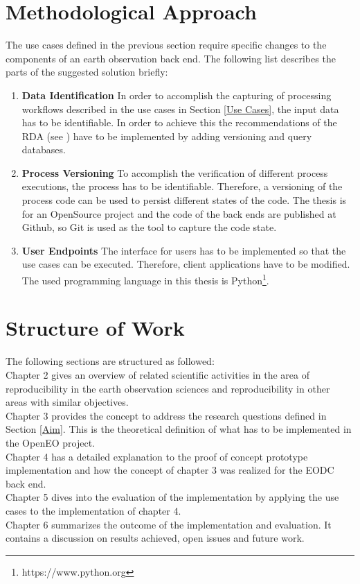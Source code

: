 \documentclass[draft,final]{vutinfth} %
\begin{document}
\section{Methodological Approach}\label{Method}
The use cases defined in the previous section require specific changes to the components of an earth observation back end. The following list describes the parts of the suggested solution briefly: 


\begin{enumerate}
	\item \textbf{Data Identification}
	In order to accomplish the capturing of processing workflows described in the use cases in Section \ref{Use Cases}, the input data has to be identifiable. In order to achieve this the recommendations of the RDA (see \cite{rauber2016identification}) have to be implemented by adding versioning and query databases. 
	
	\item \textbf{Process Versioning}
	To accomplish the verification of different process executions, the process has to be identifiable. Therefore, a versioning of the process code can be used to persist different states of the code. The thesis is for an OpenSource project and the code of the back ends are published at Github, so Git is used as the tool to capture the code state. 
		
	\item \textbf{User Endpoints}
	The interface for users has to be implemented so that the use cases can be executed. Therefore, client applications have to be modified. The used programming language in this thesis is Python\footnote{https://www.python.org}.
\end{enumerate}

\section{Structure of Work}\label{Structure}
The following sections are structured as followed:\\
Chapter 2 gives an overview of related scientific activities in the area of reproducibility in the earth observation sciences and reproducibility in other areas with similar objectives. \\
Chapter 3 provides the concept to address the research questions defined in Section \ref{Aim}.  This is the theoretical definition of what has to be implemented in the OpenEO project.\\
Chapter 4 has a detailed explanation to the proof of concept prototype implementation and how the concept of chapter 3 was realized for the EODC back end. \\
Chapter 5 dives into the evaluation of the implementation by applying the use cases to the implementation of chapter 4.\\
Chapter 6 summarizes the outcome of the implementation and evaluation. It contains a discussion on results achieved, open issues and future work. \\
\end{document}
